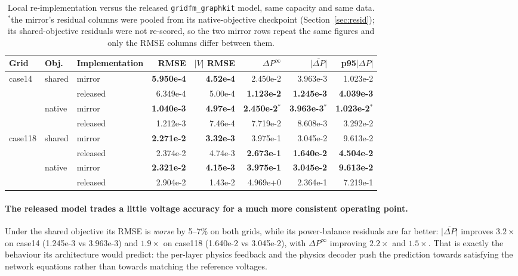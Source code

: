 \documentclass[10pt]{article}
\begin{document}
\begin{table}[H]
\centering
\small
\begin{tabular}{lllrrrrr}
\toprule
Grid & Obj. & Implementation & RMSE & \(|V|\) RMSE & \(\Delta P^{\infty}\) & \(\overline{|\Delta P|}\) & p95\(|\Delta P|\) \\
\midrule
case14 & shared & mirror   & \textbf{5.950e-4} & \textbf{4.52e-4} & 2.450e-2 & 3.963e-3 & 1.023e-2 \\
       &        & released & 6.349e-4 & 5.00e-4 & \textbf{1.123e-2} & \textbf{1.245e-3} & \textbf{4.039e-3} \\
       & native & mirror   & \textbf{1.040e-3} & \textbf{4.97e-4} & \textbf{2.450e-2}$^{\ast}$ & \textbf{3.963e-3}$^{\ast}$ & \textbf{1.023e-2}$^{\ast}$ \\
       &        & released & 1.212e-3 & 7.46e-4 & 7.719e-2 & 8.608e-3 & 3.292e-2 \\
\midrule
case118 & shared & mirror   & \textbf{2.271e-2} & \textbf{3.32e-3} & 3.975e-1 & 3.045e-2 & 9.613e-2 \\
        &        & released & 2.374e-2 & 4.74e-3 & \textbf{2.673e-1} & \textbf{1.640e-2} & \textbf{4.504e-2} \\
        & native & mirror   & \textbf{2.321e-2} & \textbf{4.15e-3} & \textbf{3.975e-1} & \textbf{3.045e-2} & \textbf{9.613e-2} \\
        &        & released & 2.904e-2 & 1.43e-2 & 4.969e+0 & 2.364e-1 & 7.219e-1 \\
\bottomrule
\end{tabular}
\caption{Local re-implementation versus the released \texttt{gridfm\_graphkit}
model, same capacity and same data. $^{\ast}$the mirror's residual columns were
pooled from its native-objective checkpoint (Section~\ref{sec:resid}); its
shared-objective residuals were not re-scored, so the two mirror rows repeat the
same figures and only the RMSE columns differ between them.}
\end{table}

\paragraph{The released model trades a little voltage accuracy for a much more
consistent operating point.} Under the shared objective its RMSE is
\emph{worse} by 5--7\% on both grids, while its power-balance residuals are far
better: \(\overline{|\Delta P|}\) improves \(3.2\times\) on case14 (1.245e-3 vs
3.963e-3) and \(1.9\times\) on case118 (1.640e-2 vs 3.045e-2), with
\(\Delta P^{\infty}\) improving \(2.2\times\) and \(1.5\times\). That is exactly
the behaviour its architecture would predict: the per-layer physics feedback and
the physics decoder push the prediction towards satisfying the network equations
rather than towards matching the reference voltages.
\end{document}
